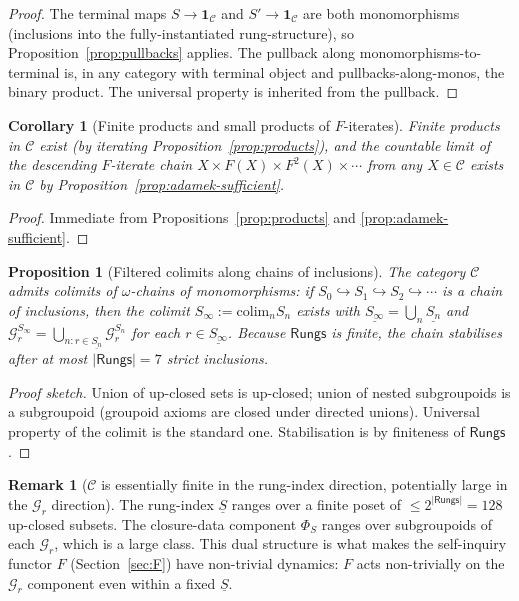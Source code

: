 \documentclass[11pt, a4paper]{amsart}
\newtheorem{proposition}[theorem]{Proposition}
\newtheorem{corollary}[theorem]{Corollary}
\theoremstyle{definition}
\newtheorem{remark}[theorem]{Remark}
\newcommand{\Rungs}{\mathsf{Rungs}}
\newcommand{\catC}{\mathcal{C}}
\newcommand{\Gcal}{\mathcal{G}}
\begin{document}
\begin{proof}
The terminal maps $S \to \mathbf{1}_\catC$ and $S' \to
\mathbf{1}_\catC$ are both monomorphisms
(inclusions into the fully-instantiated rung-structure), so
Proposition~\ref{prop:pullbacks} applies. The pullback along
monomorphisms-to-terminal is, in any category with terminal
object and pullbacks-along-monos, the binary product. The
universal property is inherited from the pullback.
\end{proof}

\begin{corollary}[Finite products and small products of
  $F$-iterates]
\label{cor:finite-products}
Finite products in $\catC$ exist (by iterating
Proposition~\ref{prop:products}), and the countable limit of the
descending $F$-iterate chain $X \times F(X) \times F^2(X) \times
\cdots$ from any $X \in \catC$ exists in $\catC$ by
Proposition~\ref{prop:adamek-sufficient}.
\end{corollary}

\begin{proof}
Immediate from Propositions~\ref{prop:products} and
\ref{prop:adamek-sufficient}.
\end{proof}

\begin{proposition}[Filtered colimits along chains of inclusions]
\label{prop:filtered-colim}
The category $\catC$ admits colimits of $\omega$-chains of
monomorphisms: if $S_0 \hookrightarrow S_1 \hookrightarrow S_2
\hookrightarrow \cdots$ is a chain of inclusions, then the
colimit $S_\infty := \mathrm{colim}_n S_n$ exists with
$\underline{S_\infty} = \bigcup_n \underline{S_n}$ and
$\Gcal_r^{S_\infty} = \bigcup_{n : r \in \underline{S_n}}
\Gcal_r^{S_n}$ for each $r \in \underline{S_\infty}$. Because
$\Rungs$ is finite, the chain stabilises after at most $|\Rungs|
= 7$ strict inclusions.
\end{proposition}

\begin{proof}[Proof sketch]
Union of up-closed sets is up-closed; union of nested
subgroupoids is a subgroupoid (groupoid axioms are closed under
directed unions). Universal property of the colimit is the
standard one. Stabilisation is by finiteness of $\Rungs$.
\end{proof}

\begin{remark}[$\catC$ is essentially finite in the rung-index
  direction, potentially large in the $\Gcal_r$ direction]
\label{rmk:size}
The rung-index $\underline{S}$ ranges over a finite poset of
$\leq 2^{|\Rungs|} = 128$ up-closed subsets. The closure-data
component $\Phi_S$ ranges over subgroupoids of each $\Gcal_r$,
which is a large class. This dual structure is what makes the
self-inquiry functor $F$ (Section~\ref{sec:F}) have non-trivial
dynamics: $F$ acts non-trivially on the $\Gcal_r$ component even
within a fixed $\underline{S}$.
\end{remark}
\end{document}
